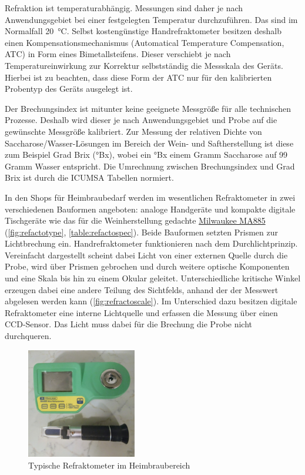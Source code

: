 \documentclass[a4paper,parskip=half]{scrartcl}
\begin{document}
Refraktion ist temperaturabhängig. Messungen sind daher je nach
Anwendungsgebiet bei einer festgelegten Temperatur durchzuführen.
Das sind im Normalfall 20~°C. Selbst kostengünstige Handrefraktometer
besitzen deshalb einen Kompensationsmechanismus (Automatical Temperature
Compensation, ATC) in Form eines Bimetallsteifens. Dieser 
verschiebt je nach Temperatureinwirkung zur Korrektur selbstständig
die Messskala des Geräts. Hierbei ist zu beachten, dass diese Form der
ATC nur für den kalibrierten Probentyp des Geräts ausgelegt ist.
\autocite{Depalma2017,Distillique2020,Gossett2012,Terrill2013}

Der Brechungsindex ist mitunter keine geeignete Messgröße für alle
technischen Prozesse. Deshalb wird dieser je nach Anwendungsgebiet
und Probe auf die gewünschte Messgröße kalibriert. Zur Messung
der relativen Dichte von Saccharose/Wasser-Lösungen im Bereich der
Wein- und Saftherstellung ist diese zum Beispiel Grad Brix (°Bx), wobei
ein °Bx einem Gramm Saccharose auf 99 Gramm Wasser entspricht. Die
Umrechnung zwischen Brechungsindex und Grad Brix ist durch die ICUMSA
Tabellen normiert.
\autocite{Bonham2001,Terrill2013}

In den Shops für Heimbraubedarf werden im wesentlichen Refraktometer in
zwei verschiedenen Bauformen angeboten: analoge Handgeräte
und kompakte digitale Tischgeräte wie das für die Weinherstellung
gedachte \href{https://milwaukeeinstruments.eu/milwaukee-ma885-digital-brix-oechsle-oe-and-kmw-babo-refractometer/}{Milwaukee MA885} (\autoref{fig:refactotype},
\autoref{table:refactospec}). Beide Bauformen setzten Prismen zur
Lichtbrechung ein. Handrefraktometer funktionieren
nach dem Durchlichtprinzip. Vereinfacht dargestellt scheint dabei Licht
von einer externen Quelle durch die Probe, wird über Prismen gebrochen
und durch weitere optische Komponenten und eine Skala bis hin zu einem
Okular geleitet. Unterschiedliche kritische Winkel erzeugen dabei eine
andere Teilung des Sichtfelds, anhand der der Messwert abgelesen werden
kann (\autoref{fig:refractoscale}). Im Unterschied dazu besitzen
digitale Refraktometer eine interne Lichtquelle und erfassen die
Messung über einen CCD-Sensor. Das Licht muss dabei für die Brechung die Probe
nicht durchqueren. \autocite{AKRSSOGH2021,Gamer1959,Terrill2013}
 
\begin{figure}[h]
\centering
\includegraphics[width=4.8cm]{images/types.jpg}
\caption{Typische Refraktometer im Heimbraubereich}
\label{fig:refactotype}
\end{figure}
\end{document}
